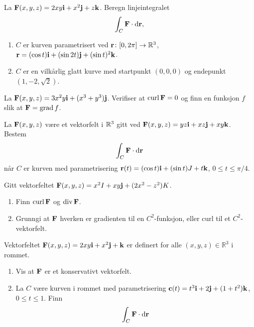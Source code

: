 

\oppgave[V2016, Oppgave 5] La $\mathbf{F}(x,y,z) = 2xy\mathbf{i} + x^2\mathbf{j} + z\mathbf{k}$. Beregn
linjeintegralet
%
\begin{equation*}
  \int_C \vek{F} \cdot \dd \vek{r},
\end{equation*}
%
\begin{enumerate}
  \item $C$ er kurven parametrisert ved $\mathbf{r} \colon [0, 2\pi] \to \mathbb{R}^3$,
    $\mathbf{r} = (\cos t) \mathbf{i} + (\sin 2t)\mathbf{j} + (\sin t)^2\mathbf{k}$.
  \item $C$ er en vilkårlig glatt kurve med startpunkt $(0,0,0)$ og endepunkt
    $(1, -2, \sqrt{2})$.
\end{enumerate}


\oppgave[K2015, Oppgave 6] La $\mathbf{F}(x,y,z) = 3x^2y\mathbf{i} + (x^3 + y^3)\mathbf{j}$.
Verifiser at $\operatorname{curl} \mathbf{F} = 0$ og finn en funksjon $f$ slik at $\mathbf{F} =
\operatorname{grad} f$.

\oppgave[V2015, Oppgave 8] La $\mathbf{F}(x,y,z)$ være et vektorfelt i $\mathbb{R}^3$ gitt ved
$\mathbf{F}(x,y,z) = yz \mathbf{i} + xz \mathbf{j} + xy\mathbf{k}$. Bestem
%
\begin{equation*}
  \int_C \vek{F} \cdot \dd\vek{r}
\end{equation*}
%
når $C$ er kurven med parametrisering $\mathbf{r}(t) = (\cos t) \mathbf{i} + (\sin t)J +
t\mathbf{k}$, $0 \leq t \leq \pi/4$.


\oppgave[V2014, Oppgave 6] Gitt vektorfeltet $\mathbf{F}(x,y,z) = x^2I + xy\mathbf{j} +
(2x^2 - z^2)K$.
%
\begin{enumerate}
  \item Finn $\operatorname{curl} \mathbf{F}$ og $\operatorname{div} \mathbf{F}$.
  \item Grunngi at $\mathbf{F}$ hverken er gradienten til en $C^2$-funksjon, eller
    curl til et $C^2$-vektorfelt.
\end{enumerate}

\oppgave[K2013, Oppgave 2] Vektorfeltet $\mathbf{F}(x,y,z) = 2xy\mathbf{i} + x^2\mathbf{j} + \mathbf{k}$ er
definert for alle $(x,y,z) \in \mathbb{R}^3$ i rommet.

\begin{enumerate}
  \item Vis at $\mathbf{F}$ er et konservativt vektorfelt.
  \item La $C$ være kurven i rommet med parametrisering $\mathbf{c}(t) = t^3\mathbf{i} +
    2\mathbf{j} + (1+t^2)\mathbf{k}$, $0 \leq t \leq 1$. Finn
    \begin{equation*}
      \int_C \vek{F} \cdot \dd\vek{r}
    \end{equation*}
\end{enumerate}

